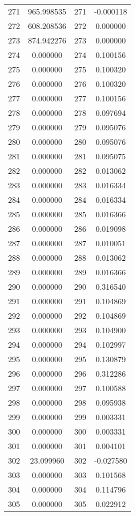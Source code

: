 \documentclass[12pt]{article}
\begin{document}
\begin{longtable}{@{}cccc@{}}
271 & 965.998535 & 271 & -0.000118 \\
272 & 608.208536 & 272 & 0.000000 \\
273 & 874.942276 & 273 & 0.000000 \\
274 & 0.000000 & 274 & 0.100156 \\
275 & 0.000000 & 275 & 0.100320 \\
276 & 0.000000 & 276 & 0.100320 \\
277 & 0.000000 & 277 & 0.100156 \\
278 & 0.000000 & 278 & 0.097694 \\
279 & 0.000000 & 279 & 0.095076 \\
280 & 0.000000 & 280 & 0.095076 \\
281 & 0.000000 & 281 & 0.095075 \\
282 & 0.000000 & 282 & 0.013062 \\
283 & 0.000000 & 283 & 0.016334 \\
284 & 0.000000 & 284 & 0.016334 \\
285 & 0.000000 & 285 & 0.016366 \\
286 & 0.000000 & 286 & 0.019098 \\
287 & 0.000000 & 287 & 0.010051 \\
288 & 0.000000 & 288 & 0.013062 \\
289 & 0.000000 & 289 & 0.016366 \\
290 & 0.000000 & 290 & 0.316540 \\
291 & 0.000000 & 291 & 0.104869 \\
292 & 0.000000 & 292 & 0.104869 \\
293 & 0.000000 & 293 & 0.104900 \\
294 & 0.000000 & 294 & 0.102997 \\
295 & 0.000000 & 295 & 0.130879 \\
296 & 0.000000 & 296 & 0.312286 \\
297 & 0.000000 & 297 & 0.100588 \\
298 & 0.000000 & 298 & 0.095938 \\
299 & 0.000000 & 299 & 0.003331 \\
300 & 0.000000 & 300 & 0.003331 \\
301 & 0.000000 & 301 & 0.004101 \\
302 & 23.099960 & 302 & -0.027580 \\
303 & 0.000000 & 303 & 0.101568 \\
304 & 0.000000 & 304 & 0.114796 \\
305 & 0.000000 & 305 & 0.022912 \\

\end{longtable}
\end{document}
